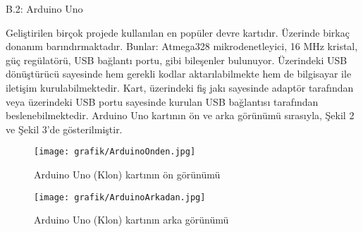 B.2: Arduino Uno 
\label{UcuncuBolum}


	Geliştirilen birçok projede kullanılan en popüler devre kartıdır. Üzerinde birkaç donanım barındırmaktadır. Bunlar: Atmega328 mikrodenetleyici, 16 MHz kristal, güç regülatörü, USB bağlantı portu, gibi bileşenler bulunuyor. Üzerindeki USB dönüştürücü sayesinde hem gerekli kodlar aktarılabilmekte hem de bilgisayar ile iletişim kurulabilmektedir. Kart, üzerindeki fiş jakı sayesinde adaptör tarafından veya üzerindeki USB portu sayesinde kurulan USB bağlantısı tarafından beslenebilmektedir. Arduino Uno kartının ön ve arka görünümü sırasıyla, Şekil 2 ve Şekil 3'de gösterilmiştir.

\begin{figure}[H]
	\centering
	\texttt{[image: grafik/ArduinoOnden.jpg]}
    \caption{Arduino Uno (Klon) kartının ön görünümü}
	\label{fig:ArduinoOndenDM}
\end{figure}
\begin{figure}[H]
	\centering
	\texttt{[image: grafik/ArduinoArkadan.jpg]}
    \caption{Arduino Uno (Klon) kartının arka görünümü}
	\label{fig:ArduinoArkadanDM}
\end{figure}

\clearpage